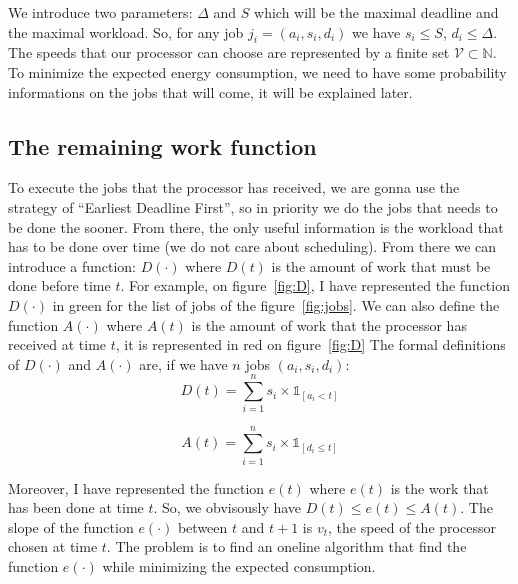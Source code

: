\documentclass[
10pt, %
a4paper, %
oneside, %
headinclude,footinclude, %
BCOR5mm, %
]{scrartcl}
\newcommand{\N}{\mathbb{N}}
\newcommand{\V}{\mathcal{V}}
\begin{document}
We introduce two parameters: $\Delta$ and $S$ which will be the maximal
deadline and the maximal workload. So, for any job
$j_i=(a_i,s_i,d_i)$ we have $s_i\leq S$, $d_i\leq \Delta$.
The speeds that our processor can choose are represented by a finite
set $\V\subset\N$. To minimize the expected energy consumption, we
need to have some probability informations on the jobs that will
come, it will be explained later.

\subsection{The remaining work function}
To execute the jobs that the processor has
received, we are gonna use the strategy of ``Earliest Deadline
First'', so in priority we do the jobs that needs to be done the
sooner. From there, the only useful information is the workload that
has to be done over time (we do not care about scheduling). From there
we can introduce a function: $D(\cdot)$ where $D(t)$ is the amount of
work that must be done before time $t$. For example, on
figure~\ref{fig:D}, I have represented the function $D(\cdot)$ in
green for the list of jobs of the figure~\ref{fig:jobs}. We can also
define the function $A(\cdot)$ where $A(t)$ is the amount of work that
the processor has received at time $t$, it is represented in red on
figure~\ref{fig:D} The formal definitions of $D(\cdot)$ and $A(\cdot)$
are, if we have $n$ jobs $(a_i,s_i,d_i)$:
\begin{equation}
  \label{eq:D}
  D(t) = \sum_{i=1}^ns_i\times\mathbb{1}_{[a_i<t]}
\end{equation}

\begin{equation}
  \label{eq:A}
  A(t) = \sum_{i=1}^ns_i\times\mathbb{1}_{[d_i\leq t]}
\end{equation}

Moreover, I have represented the function $e(t)$
where $e(t)$ is the work that has been done at time $t$. So, we
obvisously have $D(t)\leq e(t)\leq A(t)$. The slope of the function
$e(\cdot)$ between $t$ and $t+1$ is $v_t$, the speed of the
processor chosen at time $t$. The problem is to find an oneline
algorithm that find the function $e(\cdot)$ while minimizing the
expected consumption.\\
\end{document}
